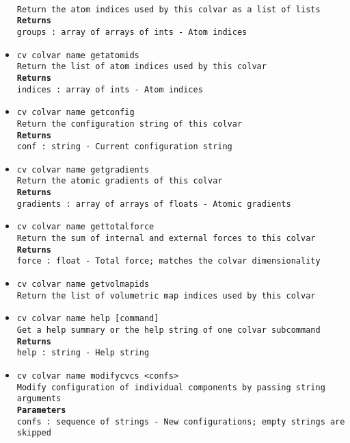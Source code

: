 \begin{itemize}
\\
\texttt{Return the atom indices used by this colvar as a list of lists}
\\
\texttt{\textbf{Returns}}
\\
\texttt{groups : array of arrays of ints - Atom indices}
\item \texttt{cv colvar name getatomids}
\\
\texttt{Return the list of atom indices used by this colvar}
\\
\texttt{\textbf{Returns}}
\\
\texttt{indices : array of ints - Atom indices}
\item \texttt{cv colvar name getconfig}
\\
\texttt{Return the configuration string of this colvar}
\\
\texttt{\textbf{Returns}}
\\
\texttt{conf : string - Current configuration string}
\item \texttt{cv colvar name getgradients}
\\
\texttt{Return the atomic gradients of this colvar}
\\
\texttt{\textbf{Returns}}
\\
\texttt{gradients : array of arrays of floats - Atomic gradients}
\item \texttt{cv colvar name gettotalforce}
\\
\texttt{Return the sum of internal and external forces to this colvar}
\\
\texttt{\textbf{Returns}}
\\
\texttt{force : float - Total force; matches the colvar dimensionality}
\item \texttt{cv colvar name getvolmapids}
\\
\texttt{Return the list of volumetric map indices used by this colvar}
\item \texttt{cv colvar name help [command]}
\\
\texttt{Get a help summary or the help string of one colvar subcommand}
\\
\texttt{\textbf{Returns}}
\\
\texttt{help : string - Help string}
\item \texttt{cv colvar name modifycvcs <confs>}
\\
\texttt{Modify configuration of individual components by passing string arguments}
\\
\texttt{\textbf{Parameters}}
\\
\texttt{confs : sequence of strings - New configurations; empty strings are skipped}

\end{itemize}
